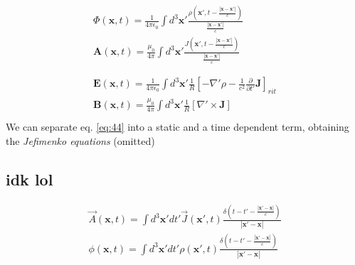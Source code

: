 \documentclass[a4paper, twocolumn]{article}
\begin{document}
\begin{gather}
  \begin{aligned}
    \label{eq:43}
    \Phi(\mathbf{x},t)=\frac{1}{4\pi\epsilon_0}\int d^3\mathbf{x'}\frac{\rho (\mathbf{x'}, t-\frac{\left|\mathbf{x}-\mathbf{x'} \right|}{c})}{\frac{\left|\mathbf{x}-\mathbf{x'} \right|}{c}} \\
    \mathbf{A}(\mathbf{x},t)=\frac{\mu_0}{4\pi}\int d^3\mathbf{x'}\frac{J (\mathbf{x'}, t-\frac{\left|\mathbf{x}-\mathbf{x'} \right|}{c})}{\frac{\left|\mathbf{x}-\mathbf{x'} \right|}{c}} \\
  \end{aligned}\\
  \begin{aligned}
    \label{eq:44}
    \mathbf{E}(\mathbf{x},t)=\frac{1}{4\pi\epsilon_0}\int d^3\mathbf{x'}\frac{1}{R}\left[-\nabla'\rho-\frac{1}{c^2}\frac{\partial}{\partial t'}\mathbf{J}  \right]_{rit} \\
    \mathbf{B}(\mathbf{x},t)=\frac{\mu_0}{4\pi}\int d^3\mathbf{x'}\frac{1}{R}\left[\nabla'\times \mathbf{J} \right] \qquad \qquad \\
  \end{aligned}
\end{gather}
We can separate eq. \ref{eq:44} into a static and a time dependent term, obtaining the \emph{Jefimenko equations} (omitted)


\subsection{idk lol}
\begin{align}
	\vec{A}(\mathbf{x},t)=\int d^3\mathbf{x'}dt'\vec{J}(\mathbf{x'},t) \frac{\delta (t-t'- \frac{\left|\mathbf{x'}-\mathbf{x}\right|}{c})}{\left|\mathbf{x'}-\mathbf{x}\right|} \tag{$\alpha$ costanti se S.I.} \\
		\phi (\mathbf{x},t)=\int d^3\mathbf{x'}dt' \rho(\mathbf{x'},t) \frac{\delta (t-t'- \frac{\left|\mathbf{x'}-\mathbf{x}\right|}{c})}{\left|\mathbf{x'}-\mathbf{x}\right|} \tag{$\alpha$ altre costanti se S.I.}
\end{align}
\end{document}
